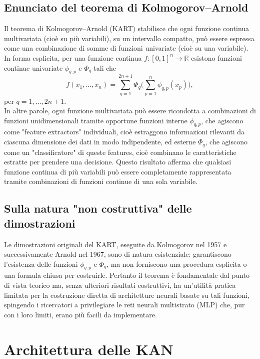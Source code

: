 \documentclass[a4paper,12pt]{report}
\begin{document}
	\subsection{Enunciato del teorema di Kolmogorov--Arnold}
	Il teorema di Kolmogorov–Arnold (KART) stabilisce che ogni funzione continua multivariata (cioè su più variabili), su un intervallo compatto, può essere espressa come una combinazione di somme di funzioni univariate (cioè su una variabile). In forma esplicita, per una funzione continua \(f:[0,1]^n \to \mathbb{R}\) esistono funzioni continue univariate \(\phi_{q,p}\) e \(\Phi_q\) tali che
	\[
	f(x_1,\dots,x_n)=\sum_{q=1}^{2n+1}\Phi_q\!\Biggl(\sum_{p=1}^n \phi_{q,p}(x_p)\Biggr),
	\]
	per \(q=1,\dots,2n+1\). \\
	In altre parole, ogni funzione multivariata può essere ricondotta a combinazioni di funzioni unidimensionali tramite opportune funzioni interne \(\phi_{q,p}\), che agiscono come "feature extractors" individuali, cioè estraggono informazioni rilevanti da ciascuna dimensione dei dati in modo indipendente, ed esterne \(\Phi_q\), che agiscono come un "classificatore" di queste features, cioè combinano le caratteristiche estratte per prendere una decisione. Questo risultato afferma che qualsiasi funzione continua di più variabili può essere completamente rappresentata tramite combinazioni di funzioni continue di una sola variabile.
	
	\subsection{Sulla natura "non costruttiva" delle dimostrazioni}
	Le dimostrazioni originali del KART, eseguite da Kolmogorov nel 1957 e successivamente Arnold nel 1967, sono di natura esistenziale: garantiscono l'esistenza delle funzioni \(\phi_{q,p}\) e \(\Phi_q\), ma non forniscono una procedura esplicita o una formula chiusa per costruirle. Pertanto il teorema è fondamentale dal punto di vista teorico ma, senza ulteriori risultati costruttivi, ha un'utilità pratica limitata per la costruzione diretta di architetture neurali basate su tali funzioni, spingendo i ricercatori a privilegiare le reti neurali multistrato (MLP) che, pur con i loro limiti, erano più facili da implementare.
	
	\section{Architettura delle KAN}
	
\end{document}
